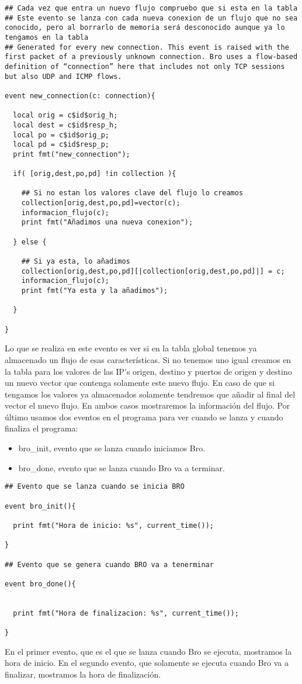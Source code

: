 \begin{lstlisting}[style=CodigoC]
## Cada vez que entra un nuevo flujo compruebo que si esta en la tabla
## Este evento se lanza con cada nueva conexion de un flujo que no sea conocido, pero al borrarlo de memoria será desconocido aunque ya lo tengamos en la tabla
## Generated for every new connection. This event is raised with the first packet of a previously unknown connection. Bro uses a flow-based definition of “connection” here that includes not only TCP sessions but also UDP and ICMP flows.

event new_connection(c: connection){

  local orig = c$id$orig_h;
  local dest = c$id$resp_h;
  local po = c$id$orig_p;
  local pd = c$id$resp_p;
  print fmt("new_connection");
 
  if( [orig,dest,po,pd] !in collection ){

    ## Si no estan los valores clave del flujo lo creamos
    collection[orig,dest,po,pd]=vector(c);
    informacion_flujo(c);
    print fmt("Añadimos una nueva conexion");
  
  } else {

    ## Si ya esta, lo añadimos
    collection[orig,dest,po,pd][|collection[orig,dest,po,pd]|] = c;
    informacion_flujo(c);
    print fmt("Ya esta y la añadimos");
 
  }

}
\end{lstlisting}

Lo que se realiza en este evento es ver si en la tabla global tenemos 
ya almacenado un flujo de esas características. Si no tenemos uno igual 
creamos en la tabla para los valores de las IP's origen, destino y puertos 
de origen y destino un nuevo vector que contenga solamente este nuevo flujo. 
En caso de que si tengamos los valores ya almacenados solamente tendremos que 
añadir al final del vector el nuevo flujo. En ambos casos mostraremos la 
información del flujo.
\intro
Por último usamos dos eventos en el programa para ver cuando se 
lanza y cuando finaliza el programa:
\intro
\begin{itemize}
\item bro\_init, evento que se lanza cuando iniciamos Bro.
\item bro\_done, evento que se lanza cuando Bro va a terminar.
\end{itemize}
\intro
\begin{lstlisting}[style=CodigoC]
## Evento que se lanza cuando se inicia BRO

event bro_init(){

  print fmt("Hora de inicio: %s", current_time());

}

## Evento que se genera cuando BRO va a tenerminar

event bro_done(){

 
  print fmt("Hora de finalizacion: %s", current_time());

}
\end{lstlisting}

En el primer evento, que es el que se lanza cuando Bro se ejecuta, 
mostramos la hora de inicio. En el segundo evento, que solamente 
se ejecuta cuando Bro va a finalizar, mostramos la hora de finalización.
